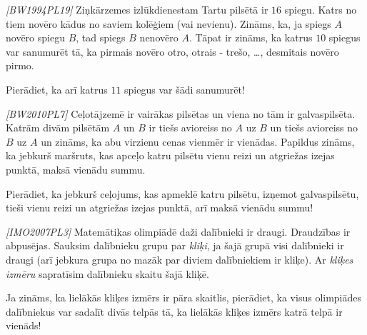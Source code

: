 



\renewcommand{\theenumi}{\alph{enumi}}



\noindent
 
\filbreak

\begin{problem}
\textit{[BW1994PL19]}
Ziņkārzemes izlūkdienestam Tartu pilsētā ir $16$ spiegu. Katrs no tiem novēro kādus no saviem kolēģiem (vai nevienu). Zināms, ka, ja spiegs $A$ novēro spiegu $B$, tad spiegs $B$ nenovēro $A$. Tāpat ir zināms, ka katrus $10$ spiegus var sanumurēt tā, ka pirmais novēro otro, otrais - trešo, \dots, desmitais novēro pirmo.

Pierādiet, ka arī katrus $11$ spiegus var šādi sanumurēt!
\end{problem}
%

\begin{problem}
\textit{[BW2010PL7]}
Ceļotājzemē ir vairākas pilsētas un viena no tām ir galvaspilsēta. Katrām divām pilsētām $A$ un $B$ ir tiešs avioreiss no $A$ uz $B$ un tiešs avioreiss no $B$ uz $A$ un zināms, ka abu virzienu cenas vienmēr ir vienādas. Papildus zināms, ka jebkurš maršruts, kas apceļo katru pilsētu vienu reizi un atgriežas izejas punktā, maksā vienādu summu.

Pierādiet, ka jebkurš ceļojums, kas apmeklē katru pilsētu, izņemot galvaspilsētu, tieši vienu reizi un atgriežas izejas punktā, arī maksā vienādu summu!
\end{problem}
%

\begin{problem}
\textit{[IMO2007PL3]}
Matemātikas olimpiādē daži dalībnieki ir draugi. Draudzības ir abpusējas. Sauksim dalībnieku grupu par \textit{kliķi}, ja šajā grupā visi dalībnieki ir draugi (arī jebkura grupa no mazāk par diviem dalībniekiem ir kliķe). Ar \textit{kliķes izmēru} sapratīsim dalībnieku skaitu šajā kliķē.

Ja zināms, ka lielākās kliķes izmērs ir pāra skaitlis, pierādiet, ka visus olimpiādes dalībniekus var sadalīt divās telpās tā, ka lielākās kliķes izmērs katrā telpā ir vienāds!
\end{problem}
%

